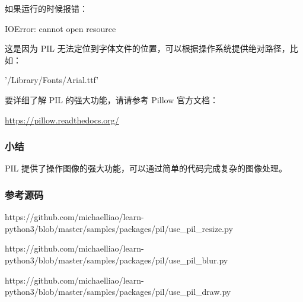 如果运行的时候报错：

\begin{pythoncode}
IOError: cannot open resource
\end{pythoncode}

这是因为 PIL
无法定位到字体文件的位置，可以根据操作系统提供绝对路径，比如：

\begin{pythoncode}
'/Library/Fonts/Arial.ttf'
\end{pythoncode}

要详细了解 PIL 的强大功能，请请参考 Pillow 官方文档：

\url{https://pillow.readthedocs.org/}

\hypertarget{ux5c0fux7ed3}{%
\subsubsection{小结}\label{ux5c0fux7ed3}}

PIL 提供了操作图像的强大功能，可以通过简单的代码完成复杂的图像处理。

\hypertarget{ux53c2ux8003ux6e90ux7801}{%
\subsubsection{参考源码}\label{ux53c2ux8003ux6e90ux7801}}

https://github.com/michaelliao/learn-python3/blob/master/samples/packages/pil/use\_pil\_resize.py

https://github.com/michaelliao/learn-python3/blob/master/samples/packages/pil/use\_pil\_blur.py

https://github.com/michaelliao/learn-python3/blob/master/samples/packages/pil/use\_pil\_draw.py

